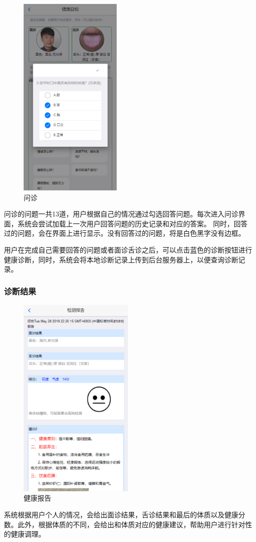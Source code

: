 \begin{figure}
    \centering
    \includegraphics[height=10cm]{images/questions.png}
    \caption{问诊}
    \label{fig:questions}
\end{figure}
问诊的问题一共13道，用户根据自己的情况通过勾选回答问题。每次进入问诊界面，系统会尝试加载上一次用户回答问题的历史记录和对应的答案。
同时，回答过的问题，会在界面上进行显示。没有回答过的问题，将是白色黑字没有边框。

用户在完成自己需要回答的问题或者面诊舌诊之后，可以点击蓝色的诊断按钮进行健康诊断，同时，系统会将本地诊断记录上传到后台服务器上，以便查询诊断记录。

\subsubsection{诊断结果}
\begin{figure}[ht]
    \centering
    \includegraphics[height=10cm]{images/report.png}
    \caption{健康报告}
    \label{fig:report}
\end{figure}
系统根据用户个人的情况，会给出面诊结果，舌诊结果和最后的体质以及健康分数。此外，根据体质的不同，会给出和体质对应的健康建议，帮助用户进行针对性的健康调理。

